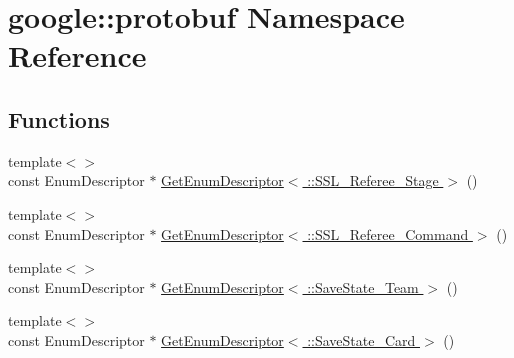 \hypertarget{namespacegoogle_1_1protobuf}{\section{google\-:\-:protobuf Namespace Reference}
\label{namespacegoogle_1_1protobuf}
}
\subsection*{Functions}
\begin{DoxyCompactItemize}
\item 
{\footnotesize template$<$$>$ }\\const Enum\-Descriptor $\ast$ \hyperlink{namespacegoogle_1_1protobuf_aabd7886713ba06c808b4513037bda37a}{Get\-Enum\-Descriptor$<$ \-::\-S\-S\-L\-\_\-\-Referee\-\_\-\-Stage $>$} ()
\item 
{\footnotesize template$<$$>$ }\\const Enum\-Descriptor $\ast$ \hyperlink{namespacegoogle_1_1protobuf_a80356b484e27bbed6328b7f00af56758}{Get\-Enum\-Descriptor$<$ \-::\-S\-S\-L\-\_\-\-Referee\-\_\-\-Command $>$} ()
\item 
{\footnotesize template$<$$>$ }\\const Enum\-Descriptor $\ast$ \hyperlink{namespacegoogle_1_1protobuf_a0473e93c024d309bb93c668fe2c0daae}{Get\-Enum\-Descriptor$<$ \-::\-Save\-State\-\_\-\-Team $>$} ()
\item 
{\footnotesize template$<$$>$ }\\const Enum\-Descriptor $\ast$ \hyperlink{namespacegoogle_1_1protobuf_a1708faf829946e6a163393be35d261c9}{Get\-Enum\-Descriptor$<$ \-::\-Save\-State\-\_\-\-Card $>$} ()
\end{DoxyCompactItemize}


